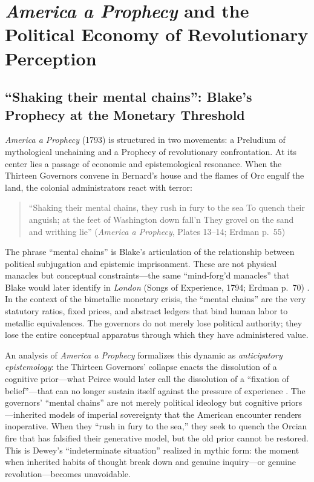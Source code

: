 \documentclass[
]{article}
\begin{document}
\newpage

\section{\texorpdfstring{\emph{America a Prophecy} and the Political
Economy of Revolutionary
Perception}{America a Prophecy and the Political Economy of Revolutionary Perception}}\label{america-a-prophecy-and-the-political-economy-of-revolutionary-perception}

\subsection{``Shaking their mental chains'': Blake's Prophecy at the
Monetary
Threshold}\label{shaking-their-mental-chains-blakes-prophecy-at-the-monetary-threshold}

\emph{America a Prophecy} (1793) is structured in two movements: a
Preludium of mythological unchaining and a Prophecy of revolutionary
confrontation. At its center lies a passage of economic and
epistemological resonance. When the Thirteen Governors convene in
Bernard's house and the flames of Orc engulf the land, the colonial
administrators react with terror:

\begin{quote}
``Shaking their mental chains, they rush in fury to the sea To quench
their anguish; at the feet of Washington down fall'n They grovel on the
sand and writhing lie'' (\emph{America a Prophecy}, Plates 13--14;
Erdman p.~55) \citep{erdman1988complete, blake1793america}
\end{quote}

The phrase ``mental chains'' is Blake's articulation of the relationship
between political subjugation and epistemic imprisonment. These are not
physical manacles but conceptual constraints---the same ``mind-forg'd
manacles'' that Blake would later identify in \emph{London} (Songs of
Experience, 1794; Erdman p.~70) \citep{erdman1988complete}. In the
context of the bimetallic monetary crisis, the ``mental chains'' are the
very statutory ratios, fixed prices, and abstract ledgers that bind
human labor to metallic equivalences. The governors do not merely lose
political authority; they lose the entire conceptual apparatus through
which they have administered value.

An analysis of \emph{America a Prophecy} formalizes this dynamic as
\emph{anticipatory epistemology}: the Thirteen Governors' collapse
enacts the dissolution of a cognitive prior---what Peirce would later
call the dissolution of a ``fixation of belief''---that can no longer
sustain itself against the pressure of experience
\citep{friedman2026blake, friedman2026doors}. The governors' ``mental
chains'' are not merely political ideology but cognitive
priors---inherited models of imperial sovereignty that the American
encounter renders inoperative. When they ``rush in fury to the sea,''
they seek to quench the Orcian fire that has falsified their generative
model, but the old prior cannot be restored. This is Dewey's
``indeterminate situation'' realized in mythic form: the moment when
inherited habits of thought break down and genuine inquiry---or genuine
revolution---becomes unavoidable.
\end{document}
